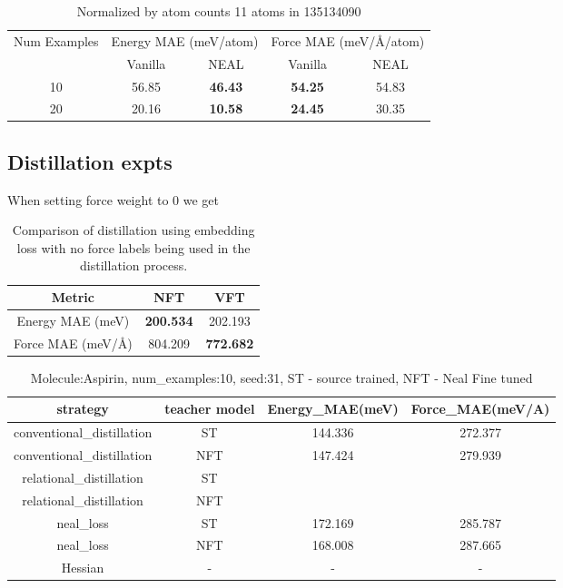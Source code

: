 \documentclass[12pt]{article}
\theoremstyle{definition}
\theoremstyle{remark}
\begin{document}
\begin{table}[htbp]
\centering
\begin{tabular}{c|cc|cc}
\hline
\multirow{2}{*}{Num Examples} & \multicolumn{2}{c|}{Energy MAE (meV/atom)} & \multicolumn{2}{c}{Force MAE (meV/\AA/atom)} \\
 & Vanilla & NEAL & Vanilla & NEAL \\
\hline
10 & 56.85 & \textbf{46.43} & \textbf{54.25} & 54.83 \\
20 & 20.16 & \textbf{10.58} & \textbf{24.45} & 30.35 \\
\hline
\end{tabular}
\caption{Normalized by atom counts 11 atoms in 135134090}
\end{table}


\subsection{Distillation expts}
When setting force weight to 0 we get

\begin{table}[h]
\centering
\begin{tabular}{c|cc}
\hline
Metric & NFT & VFT \\
\hline
Energy MAE (meV) & \textbf{200.534} & 202.193 \\
Force MAE (meV/\AA) & 804.209 & \textbf{772.682} \\
\hline
\end{tabular}
\caption{Comparison of distillation using embedding loss with no force labels being used in the distillation process.}
\end{table}

\begin{table}[h!]
    \centering
    \begin{tabular}{|c|c|c|c|}
    \hline
      strategy   & teacher model &  Energy\_MAE(meV) & Force\_MAE(meV/A)  \\
    \hline
    conventional\_distillation & ST & 144.336 &  272.377 \\
    \hline
    conventional\_distillation & NFT & 147.424 & 279.939  \\
    \hline
    relational\_distillation & ST & & \\
    \hline
    relational\_distillation & NFT & & \\
    \hline
    neal\_loss & ST & 172.169 & 285.787 \\
    \hline
    neal\_loss & NFT & 168.008 & 287.665 \\
    \hline
    Hessian & -  &- & -  \\
    \hline

    \end{tabular}
    \caption{Molecule:Aspirin, num\_examples:10, seed:31, ST - source trained, NFT - Neal Fine tuned}
    \label{tab:placeholder}
\end{table}
\newpage
\end{document}
